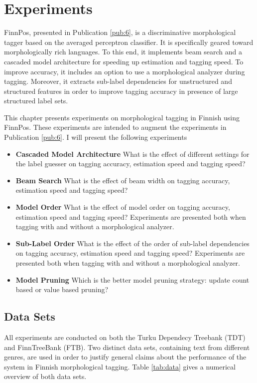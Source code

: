 \chapter{Experiments}
\label{chapter:finnpos}

FinnPos, presented in Publication \ref{pub:6}, is a discriminative
morphological tagger based on the averaged perceptron classifier. It
is specifically geared toward morphologically rich languages. To this
end, it implements beam search and a cascaded model architecture for
speeding up estimation and tagging speed. To improve accuracy, it
includes an option to use a morphological analyzer during
tagging. Moreover, it extracts sub-label dependencies for unstructured
and structured features in order to improve tagging accuracy in presence of
large structured label sets.

This chapter presents experiments on morphological tagging in Finnish
using FinnPos. These experiments are intended to augment the
experiments in Publication \ref{pub:6}. I will present the following
experiments

\begin{itemize}
\item {\bf Cascaded Model Architecture} What is the effect of different settings for the label guesser on tagging accuracy, estimation speed and tagging speed?
\item {\bf Beam Search} What is the effect of beam width on tagging accuracy, estimation speed and tagging speed?
\item {\bf Model Order} What is the effect of model order on tagging accuracy, estimation speed and tagging speed? Experiments are presented both when tagging with and without a morphological analyzer.
\item {\bf Sub-Label Order} What is the effect of the order of sub-label dependencies on tagging accuracy, estimation speed and tagging speed? Experiments are presented both when tagging with and without a morphological analyzer.
\item {\bf Model Pruning} Which is the better model pruning strategy: update count based or value based pruning?
\end{itemize}



\section{Data Sets}
All experiments are conducted on both the Turku Dependecy Treebank
\citep{Haverinen2013} (TDT) and FinnTreeBank \citep{Voutilainen2011}
(FTB). Two distinct data sets, containing text from different genres,
are used in order to justify general claims about the performance of
the system in Finnish morphological tagging. Table \ref{tab:data} gives a
numerical overview of both data sets.

